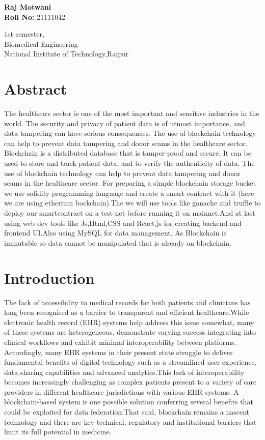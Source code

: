\documentclass[12pt]{article}
\begin{document}
\raggedleft

\vspace{70mm}

\textbf{Raj Motwani}
\\ \textbf{Roll No:} 21111042


1st semester,
\\ Biomedical Engineering
\\National Institute of Technology,Raipur

\raggedright 
\vspace{110mm}
\section*{ \Huge Abstract }
\Large
\raggedright
The healthcare sector is one of the most important and sensitive industries in the world. The security and privacy of patient data is of utmost importance, and data tampering can have serious consequences.
The use of blockchain technology can help to prevent data tampering and donor scams in the healthcare sector. Blockchain is a distributed database that is tamper-proof and secure. It can be used to store and track patient data, and to verify the authenticity of data.
The use of blockchain technology can help to prevent data tampering and donor scams in the healthcare sector.
For preparing a simple blockchain storage bucket we use solidity programming language and create a smart contract with it (here we are using etherium bockchain).The we will use tools like ganache and truffle to deploy our smartcontract on a test-net before running it on mainnet.And at last using web dev tools like Js,Html,CSS and React.js for creating backend and frontend UI.Also using MySQL for data management.
As Blockchain is immutable so data cannot be manipulated that is already on blockchain.

\section*{ \Huge Introduction }
The lack of accessibility to medical records for both patients and clinicians has long been recognised as a barrier to transparent and efficient healthcare.While electronic health record (EHR) systems help address this issue somewhat, many of these systems are heterogeneous, demonstrate varying success integrating into clinical workflows and exhibit minimal interoperability between platforms. Accordingly, many EHR systems in their present state struggle to deliver fundamental benefits of digital technology such as a streamlined user experience, data sharing capabilities and advanced analytics.This lack of interoperability becomes increasingly challenging as complex patients present to a variety of care providers in different healthcare jurisdictions with various EHR systems. A blockchain-based system is one possible solution conferring several benefits that could be exploited for data federation.That said, blockchain remains a nascent technology and there are key technical, regulatory and institutional barriers that limit its full potential in medicine.
\end{document}
